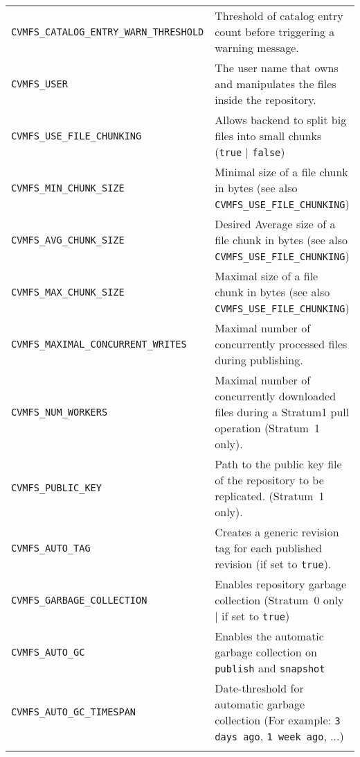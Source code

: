 \begin{longtable}{lX}
		\tt CVMFS\_CATALOG\_ENTRY\_WARN\_THRESHOLD	& Threshold of catalog entry count before triggering a warning message.\\
		\tt CVMFS\_USER						& The user name that owns and manipulates the files inside the repository.\\
		\tt CVMFS\_USE\_FILE\_CHUNKING		& Allows backend to split big files into small chunks (\texttt{true} | \texttt{false})\\
		\tt CVMFS\_MIN\_CHUNK\_SIZE			& Minimal size of a file chunk in bytes \newline (see also \texttt{CVMFS\_USE\_FILE\_CHUNKING})\\
		\tt CVMFS\_AVG\_CHUNK\_SIZE			& Desired Average size of a file chunk in bytes \newline (see also \texttt{CVMFS\_USE\_FILE\_CHUNKING})\\
		\tt CVMFS\_MAX\_CHUNK\_SIZE			& Maximal size of a file chunk in bytes \newline (see also \texttt{CVMFS\_USE\_FILE\_CHUNKING})\\
		\tt CVMFS\_MAXIMAL\_CONCURRENT\_WRITES	& Maximal number of concurrently processed files during publishing.\\
		\tt CVMFS\_NUM\_WORKERS				& Maximal number of concurrently downloaded files during a Stratum1 pull operation (Stratum~1 only).\\
		\tt CVMFS\_PUBLIC\_KEY				& Path to the public key file of the repository to be replicated. (Stratum~1 only).\\
		\tt CVMFS\_AUTO\_TAG					& Creates a generic revision tag for each published revision (if set to \texttt{true}).\\
		\tt CVMFS\_GARBAGE\_COLLECTION		& Enables repository garbage collection \newline (Stratum~0 only | if set to \texttt{true})\\
		\tt CVMFS\_AUTO\_GC					& Enables the automatic garbage collection on \texttt{publish} and \texttt{snapshot}\\
		\tt CVMFS\_AUTO\_GC\_TIMESPAN		& Date-threshold for automatic garbage collection \newline (For example: \texttt{3 days ago}, \texttt{1 week ago}, ...)\\
		\bottomrule

		\label{tab:serverparameters}
	\end{longtable}

